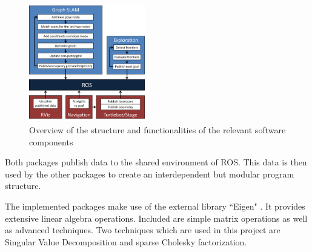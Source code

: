 \documentclass{ba-kecs}
\begin{document}
\begin{figure}[htbp]
	\centering
		\includegraphics[width=0.45\textwidth]{figures/Program_structure.png}
	\caption{Overview of the structure and functionalities of the relevant software components}
	\label{fig:program_structure}
\end{figure}

Both packages publish data to the shared environment of ROS. This data is then used by the other packages to create an interdependent but modular program structure.

The implemented packages make use of the external library ``Eigen" \citep{eigen}. It provides extensive linear algebra operations. Included are simple matrix operations as well as advanced techniques. Two techniques which are used in this project are Singular Value Decomposition and sparse Cholesky factorization.
\end{document}
